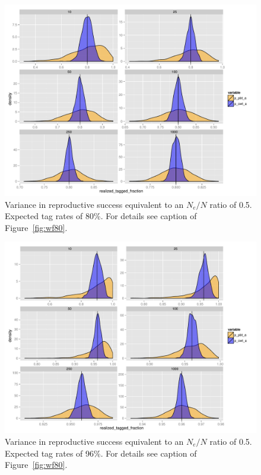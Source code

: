 \documentclass[11pt]{article}
\begin{document}
\begin{figure}
\includegraphics[width = \textwidth]{images/tag_fracts_80_Ne50.pdf}
\caption{Variance in reproductive success equivalent to an $N_e/N$ ratio of 0.5. Expected tag rates of 80\%. For details
see caption of Figure~\protect\ref{fig:wf80}.}
\label{fig:ne50-80}
\end{figure}

\begin{figure}
\includegraphics[width = \textwidth]{images/tag_fracts_96_Ne50.pdf}
\caption{Variance in reproductive success equivalent to an $N_e/N$ ratio of 0.5. Expected tag rates of 96\%. For details
see caption of Figure~\protect\ref{fig:wf80}.}
\label{fig:ne50-96}
\end{figure}
\end{document}
